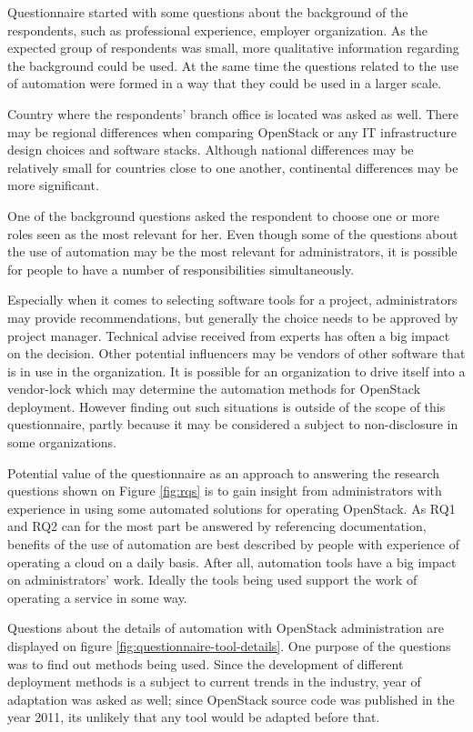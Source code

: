 \documentclass[officiallayout]{tktla}
\begin{document}
Questionnaire started with some questions about the background of the
respondents, such as professional experience, employer organization. As the
expected group of respondents was small, more qualitative information regarding
the background could be used. At the same time the questions related to the use
of automation were formed in a way that they could be used in a larger scale.

Country where the respondents' branch office is located was asked as well.
There may be regional differences when comparing OpenStack or any IT
infrastructure design choices and software stacks. Although national
differences may be relatively small for countries close to one another,
continental differences may be more significant.

One of the background questions asked the respondent to choose one or more
roles seen as the most relevant for her. Even though some of the questions
about the use of automation may be the most relevant for administrators, it is
possible for people to have a number of responsibilities simultaneously.

Especially when it comes to selecting software tools for a project,
administrators may provide recommendations, but generally the choice needs to
be approved by project manager. Technical advise received from experts has
often a big impact on the decision. Other potential influencers may be vendors
of other software that is in use in the organization. It is possible for an
organization to drive itself into a vendor-lock which may determine the
automation methods for OpenStack deployment. However finding out such
situations is outside of the scope of this questionnaire, partly because it may
be considered a subject to non-disclosure in some organizations.

Potential value of the questionnaire as an approach to answering the research
questions shown on Figure \ref{fig:rqs} is to gain insight from administrators
with experience in using some automated solutions for operating OpenStack. As
RQ1 and RQ2 can for the most part be answered by referencing documentation,
benefits of the use of automation are best described by people with experience
of operating a cloud on a daily basis. After all, automation tools have a big
impact on administrators' work. Ideally the tools being used support the work
of operating a service in some way.

Questions about the details of automation with OpenStack administration are
displayed on figure \ref{fig:questionnaire-tool-details}. One purpose of the
questions was to find out methods being used. Since the development of
different deployment methods is a subject to current trends in the industry,
year of adaptation was asked as well; since OpenStack source code was published
in the year 2011, its unlikely that any tool would be adapted before that.
\end{document}
